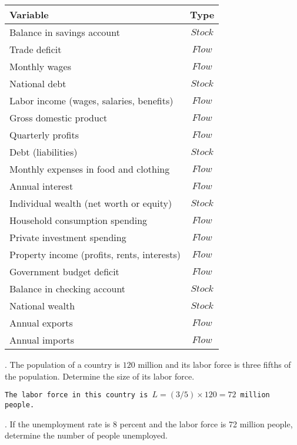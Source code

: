 \documentclass[12pt]{article}
\begin{document}
\begin{center}
\begin{tabular}{l | c}
  \hline    	
  Variable & Type \\
  \hline      
Balance in savings account & $Stock$ \\
Trade deficit & $Flow$ \\
Monthly wages & $Flow$ \\
National debt & $Stock$ \\
Labor income (wages, salaries, benefits) & $Flow$ \\
Gross domestic product & $Flow$ \\
Quarterly profits & $Flow$ \\
Debt (liabilities) & $Stock$ \\
Monthly expenses in food and clothing & $Flow$ \\
Annual interest & $Flow$ \\
Individual wealth (net worth or equity) & $Stock$ \\
Household consumption spending & $Flow$ \\
Private investment spending & $Flow$ \\
Property income (profits, rents, interests) & $Flow$ \\
Government budget deficit & $Flow$ \\
Balance in checking account & $Stock$ \\
National wealth & $Stock$ \\
Annual exports & $Flow$ \\
Annual imports & $Flow$ \\
\hline
\end{tabular}
\end{center}

\vspace{12pt}

. The population of a country is $120$ million and its labor force is three fifths of the population.  Determine the size of its labor force.

\vspace{10pt}

\texttt{The labor force in this country is $L = (3/5) \times 120 = 72$ million people.}

\vspace{12pt}

. If the unemployment rate is 8 percent and the labor force is 72 million people, determine the number of people unemployed. 
\end{document}
